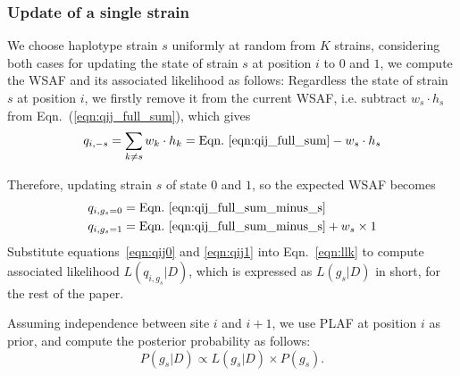 \documentclass{bioinfo}
\begin{document}
\subsubsection{Update of a single strain}

We choose haplotype strain $s$ uniformly at random from $K$ strains, considering both cases for updating the state of strain $s$ at position $i$ to $0$ and $1$, we compute the WSAF and its associated likelihood as follows: Regardless the state of strain $s$ at position $i$, we firstly remove it from the current WSAF, i.e. subtract $ w_s \cdot h_s$ from Eqn.~(\ref{eqn:qij_full_sum}), which gives
\begin{equation}
q_{i,-s} = \sum_{k\neq s} w_k \cdot h_k = \textrm{Eqn.~\eqref{eqn:qij_full_sum}} -  w_s \cdot h_s \label{eqn:qij_full_sum_minus_s}
\end{equation}

Therefore, updating strain $s$ of state $0$ and $1$, so the expected WSAF becomes
\begin{align}
q_{i,g_s=0} & = \textrm{Eqn.~\eqref{eqn:qij_full_sum_minus_s}} \label{eqn:qij0}\\
q_{i,g_s=1} & = \textrm{Eqn.~\eqref{eqn:qij_full_sum_minus_s}} + w_s \times 1 \label{eqn:qij1}
\end{align}
Substitute equations~\eqref{eqn:qij0} and \eqref{eqn:qij1} into Eqn.~\eqref{eqn:llk} to compute associated likelihood $L(q_{i,g_s} |D)$, which is expressed as $L(g_s |D)$ in short, for the rest of the paper.


Assuming independence between site $i$ and $i+1$, we use PLAF at position $i$ as prior, and compute the posterior probability as follows:
\begin{equation}
P(g_s | D) \propto L(g_s|D) \times P(g_s).\label{eqn:post:LDfree}
\end{equation}

\end{document}
